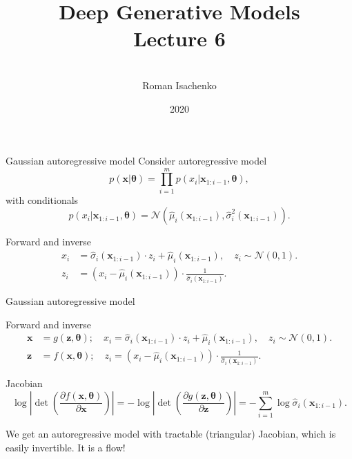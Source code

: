 \documentclass{beamer}
\title[\hbox to 56mm{Deep Generative Models  \hfill\insertframenumber\,/\,\inserttotalframenumber}]
{Deep Generative Models \\ Lecture 6}
\author[Roman Isachenko]{\\Roman Isachenko}
\institute[MIPT]{Moscow Institute of Physics and Technology \\
}
\date{2020}
\newcommand{\bx}{\mathbf{x}}
\newcommand{\bz}{\mathbf{z}}
\newcommand{\btheta}{\boldsymbol{\theta}}
\begin{document}
\begin{frame}
\titlepage
\end{frame}
\begin{frame}{Gaussian autoregressive model}
	Consider autoregressive model
	\[
		p(\bx | \btheta) = \prod_{i=1}^m p(x_i | \bx_{1:i - 1}, \btheta),
	\]
	with conditionals
	\[
		p(x_i | \bx_{1:i - 1}, \btheta) = \mathcal{N} \left(\hat{\mu}_i(\bx_{1:i-1}), \hat{\sigma}^2_i (\bx_{1:i-1})\right).
	\]
	\vspace{-0.5cm}
	\begin{block}{Forward and inverse}
		\vspace{-0.3cm}
		\begin{align*}
			x_i &= \hat{\sigma}_i (\bx_{1:i-1}) \cdot z_i + \hat{\mu}_i(\bx_{1:i-1}), \quad z_i \sim \mathcal{N}(0, 1). \\
			z_i &= \left(x_i - \hat{\mu}_i(\bx_{1:i-1}) \right) \cdot \frac{1}{\hat{\sigma}_i (\bx_{1:i-1}) }.
		\end{align*}
	\end{block}
\end{frame}
\begin{frame}{Gaussian autoregressive model}
	\begin{block}{Forward and inverse}
		\vspace{-0.3cm}
		\begin{align*}
			\bx &= g(\bz, \btheta); \quad x_i = \hat{\sigma}_i (\bx_{1:i-1}) \cdot z_i + \hat{\mu}_i(\bx_{1:i-1}), \quad z_i \sim \mathcal{N}(0, 1). \\
			\bz &= f(\bx, \btheta); \quad z_i = \left(x_i - \hat{\mu}_i(\bx_{1:i-1}) \right) \cdot \frac{1}{\hat{\sigma}_i (\bx_{1:i-1}) }.
		\end{align*}
	\vspace{-0.3cm}
	\end{block}
	\begin{block}{Jacobian}
		\vspace{-0.3cm}
		\[
		\log \left|\det \left( \frac{\partial f(\bx, \btheta)}{\partial \bx} \right) \right| = -\log \left|\det \left( \frac{\partial g(\bz, \btheta)}{\partial \bz} \right) \right| = - \sum_{i = 1}^m \log \hat{\sigma}_i (\bx_{1:i-1}).
		\]
		\vspace{-0.3cm}
	\end{block} 
	We get an autoregressive model with tractable (triangular) Jacobian, which is easily invertible. It is a flow!
\end{frame}
\end{document}
